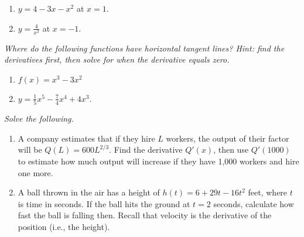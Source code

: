 \documentclass[10pt]{article}
\newcommand{\ds}{\displaystyle}
\begin{document}
\begin{multicols}{2}
\begin{enumerate}
\setcounter{enumi}{\theenumCount}
\item $\ds y= 4 - 3x - x^2$ at $x=1$.


\item $\ds y = \frac{4}{x^2}$ at $x = -1$.


\setcounter{enumCount}{\theenumi}
\end{enumerate}
\end{multicols}
\vspace*{0.75in}

\newpage
\noindent
\textit{Where do the following functions have horizontal tangent lines? Hint: find the derivatives first, then solve for when the derivative equals zero.}
\begin{multicols}{2}
\begin{enumerate}
\setcounter{enumi}{\theenumCount}

\item $\ds f(x) =  x^3-3x^2$ 

\item $\ds y= \tfrac{1}{5} x^{5} - \tfrac{7}{4} x^{4} + 4 x^{3}$. 
\setcounter{enumCount}{\theenumi}
\end{enumerate}
\end{multicols}
\vfill

\noindent
\textit{Solve the following.}
\begin{enumerate}
\setcounter{enumi}{\theenumCount}
\item A company estimates that if they hire $L$ workers, the output of their factor will be $Q(L) = 600 L^{2/3}$.  Find the derivative $Q'(x)$, then use $Q'(1000)$ to estimate how much output will increase if they have 1,000 workers and hire one more.
\vfill

\item A ball thrown in the air has a height of $h(t) = 6 + 29 t - 16t^2$ feet, where $t$ is time in seconds.  If the ball hits the ground at $t = 2$ seconds, calculate how fast the ball is falling then.  Recall that velocity is the derivative of the position (i.e., the height). 
\vfill

\end{enumerate}
\end{document}
